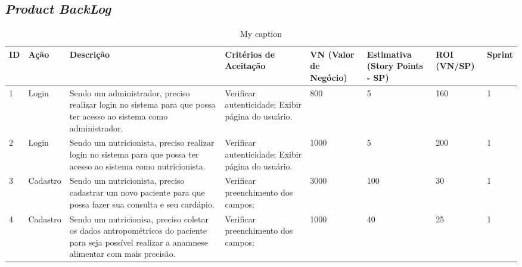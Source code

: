 
\begin{apendicesenv}
\partapendices

\begin{landscape}
\chapter{\textit{Product BackLog}}
\begin{table}[h]
\centering
\caption{My caption}
\label{my-label}
\begin{tabular}{|p{0.5cm}|p{2cm}|p{5cm}|p{4cm}|p{2.5cm}|p{3.7cm}|p{2cm}|p{2cm}|}
\hline
\textbf{ID} & \textbf{Ação} & \textbf{Descrição}                                                                                                 & \textbf{Critérios de Aceitação} & \textbf{VN (Valor de Negócio)} & \textbf{Estimativa (Story Points - SP)} & \textbf{ROI (VN/SP)} & \textbf{Sprint} \\ \hline
1                               & Login                             & Sendo um administrador, preciso realizar login no sistema para que possa ter acesso ao sistema como administrador. & Verificar autenticidade; Exibir página do usuário.  & 800                                                & 5                                                           & 160                                      & 1                                   \\ \hline
2                               & Login                             & Sendo um nutricionista, preciso realizar login no sistema para que possa ter acesso ao sistema como nutricionista. & Verificar autenticidade; Exibir página do usuário.  & 1000                                               & 5                                                           & 200                                      & 1                                   \\ \hline
3                               & Cadastro                          & Sendo um nutricionista, preciso cadastrar um novo paciente para que possa fazer sua consulta e seu cardápio.       & Verificar preenchimento dos campos;                 & 3000                                               & 100                                                         & 30                                       & 1                                   \\ \hline
4                               & Cadastro                          & Sendo um nutricionisa, preciso coletar os dados antropométricos do paciente para seja possível realizar a anamnese alimentar com mais precisão. & Verificar preenchimento dos campos;                 & 1000                                               & 40                                                          & 25                                       & 1                                   \\ \hline

\end{tabular}
\end{table}
\end{landscape}
\end{apendicesenv}
